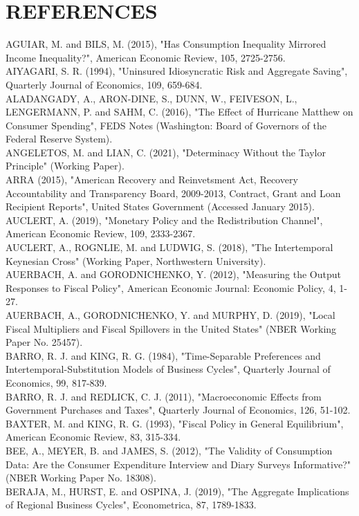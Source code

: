 \documentclass[10pt]{article}
\begin{document}
\section*{REFERENCES}
AGUIAR, M. and BILS, M. (2015), "Has Consumption Inequality Mirrored Income Inequality?", American Economic Review, 105, 2725-2756.\\
AIYAGARI, S. R. (1994), "Uninsured Idiosyncratic Risk and Aggregate Saving", Quarterly Journal of Economics, 109, 659-684.\\
ALADANGADY, A., ARON-DINE, S., DUNN, W., FEIVESON, L., LENGERMANN, P. and SAHM, C. (2016), "The Effect of Hurricane Matthew on Consumer Spending", FEDS Notes (Washington: Board of Governors of the Federal Reserve System).\\
ANGELETOS, M. and LIAN, C. (2021), "Determinacy Without the Taylor Principle" (Working Paper).\\
ARRA (2015), "American Recovery and Reinvetsment Act, Recovery Accountability and Transparency Board, 2009-2013, Contract, Grant and Loan Recipient Reports", United States Government (Accessed January 2015).\\
AUCLERT, A. (2019), "Monetary Policy and the Redistribution Channel", American Economic Review, 109, 2333-2367.\\
AUCLERT, A., ROGNLIE, M. and LUDWIG, S. (2018), "The Intertemporal Keynesian Cross" (Working Paper, Northwestern University).\\
AUERBACH, A. and GORODNICHENKO, Y. (2012), "Measuring the Output Responses to Fiscal Policy", American Economic Journal: Economic Policy, 4, 1-27.\\
AUERBACH, A., GORODNICHENKO, Y. and MURPHY, D. (2019), "Local Fiscal Multipliers and Fiscal Spillovers in the United States" (NBER Working Paper No. 25457).\\
BARRO, R. J. and KING, R. G. (1984), "Time-Separable Preferences and Intertemporal-Substitution Models of Business Cycles", Quarterly Journal of Economics, 99, 817-839.\\
BARRO, R. J. and REDLICK, C. J. (2011), "Macroeconomic Effects from Government Purchases and Taxes", Quarterly Journal of Economics, 126, 51-102.\\
BAXTER, M. and KING, R. G. (1993), "Fiscal Policy in General Equilibrium", American Economic Review, 83, 315-334.\\
BEE, A., MEYER, B. and JAMES, S. (2012), "The Validity of Consumption Data: Are the Consumer Expenditure Interview and Diary Surveys Informative?" (NBER Working Paper No. 18308).\\
BERAJA, M., HURST, E. and OSPINA, J. (2019), "The Aggregate Implications of Regional Business Cycles", Econometrica, 87, 1789-1833.
\end{document}
